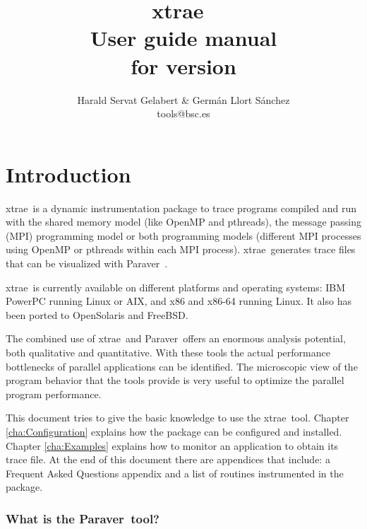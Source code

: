 \documentclass[twoside,a4,english,11pt]{book}
\newcommand{\TRACE}{{\sf {E}xtrae}\ }
\newcommand{\PARAVER}{{\sf Paraver}\ }
\begin{document}


\title{\TRACE \\
       User guide manual\\
       for version \TRACEVERSION}
\author{
Harald Servat Gelabert \& Germ\'an Llort S\'anchez\\
tools@bsc.es
}

\maketitle
\tableofcontents
\listoftables





\chapter{Introduction}\label{cha:Introduction}

\TRACE is a dynamic instrumentation package to trace programs compiled and run with the shared memory model (like OpenMP and pthreads), the message passing (MPI) programming model or both programming models (different MPI processes using OpenMP or pthreads within each MPI process). \TRACE generates trace files that can be visualized with \PARAVER.

\TRACE is currently available on different platforms and operating systems: IBM PowerPC running Linux or AIX, and x86 and x86-64 running Linux. It also has been ported to OpenSolaris and FreeBSD.

The combined use of \TRACE and \PARAVER offers an enormous analysis potential, both qualitative and quantitative. With these tools the actual performance bottlenecks of parallel applications can be identified. The microscopic view of the program behavior that the tools provide is very useful to optimize the parallel program performance.

This document tries to give the basic knowledge to use the \TRACE tool. Chapter \ref{cha:Configuration} explains how the package can be configured and installed. Chapter \ref{cha:Examples} explains how to monitor an application to obtain its trace file. At the end of this document there are appendices that include: a Frequent Asked Questions appendix and a list of routines instrumented in the package.

\subsection*{What is the \PARAVER tool?}
\end{document}
